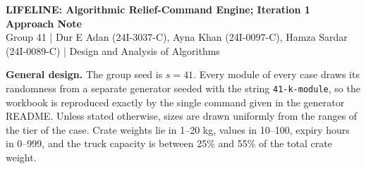 \documentclass[10pt,a4paper]{article}
\begin{document}
{\large\bfseries LIFELINE: Algorithmic Relief-Command Engine; Iteration 1 Approach Note}\\[1pt]
\small Group 41 \;|\; Dur E Adan (24I-3037-C), Ayna Khan (24I-0097-C), Hamza Sardar (24I-0089-C) \;|\; Design and Analysis of Algorithms\\[3pt]
\normalsize

\textbf{General design.} The group seed is $s=41$. Every module of every case draws its randomness from a separate generator seeded with the string \texttt{41-k-module}, so the workbook is reproduced exactly by the single command given in the generator README. Unless stated otherwise, sizes are drawn uniformly from the ranges of the tier of the case. Crate weights lie in 1--20 kg, values in 10--100, expiry hours in 0--999, and the truck capacity is between 25\% and 55\% of the total crate weight.









\end{document}
